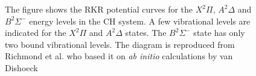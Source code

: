 \begin{figure}

\centering



\caption[Potential curves for electronic energy levels in the CH molecule]{The figure shows the RKR potential curves for the \(X^2\Pi\), \(A^2\Delta\) and \(B^2\Sigma^-\) energy levels in the CH system. A few vibrational levels are indicated for the \(X^2\Pi\) and \(A^2\Delta\) states. The \(B^2\Sigma^-\) state has only two bound vibrational levels. The diagram is reproduced from Richmond et al.\cite{2005-richmond} who based it on \emph{ab initio} calculations by van Dishoeck\cite{1987-vandishoeck}}

\label{fig:chRKR}

\end{figure}

